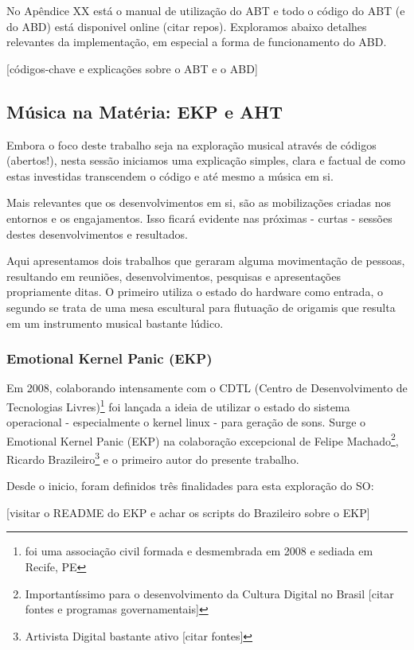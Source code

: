 No Apêndice XX está o manual de utilização do ABT e todo o código do ABT (e do ABD) está
disponivel online (citar repos). Exploramos abaixo detalhes relevantes da implementação,
em especial a forma de funcionamento do ABD.

[códigos-chave e explicações sobre o ABT e o ABD]




  \subsection{Música na Matéria: EKP e AHT}

Embora o foco deste trabalho seja na exploração musical através de códigos (abertos!),
nesta sessão iniciamos uma explicação simples, clara e factual de como estas
investidas transcendem o código e até mesmo a música em si.

Mais relevantes que os desenvolvimentos em si, são as mobilizações criadas nos
entornos e os engajamentos. Isso ficará evidente nas próximas - curtas - sessões
destes desenvolvimentos e resultados.

Aqui apresentamos dois trabalhos que geraram alguma movimentação de pessoas,
resultando em reuniões, desenvolvimentos, pesquisas e apresentações propriamente
ditas. O primeiro utiliza o estado do hardware como entrada, o segundo se trata
de uma mesa escultural para flutuação de origamis que resulta em um instrumento musical
bastante lúdico.


      \subsubsection{Emotional Kernel Panic (EKP)}

Em 2008, colaborando intensamente com o CDTL
(Centro de Desenvolvimento de Tecnologias Livres)\footnote{foi uma associação civil formada e desmembrada em 2008 e sediada em Recife, PE}
foi lançada a ideia de utilizar o estado do sistema operacional - especialmente o kernel linux - para
geração de sons. Surge o Emotional Kernel Panic (EKP) na colaboração excepcional de
Felipe Machado\footnote{Importantíssimo para o desenvolvimento da Cultura Digital no Brasil [citar fontes e programas governamentais]},
Ricardo Brazileiro\footnote{Artivista Digital bastante ativo [citar fontes]} e o primeiro autor do presente trabalho.

Desde o inicio, foram definidos três finalidades
para esta exploração do SO:

[visitar o README do EKP e achar os scripts do Brazileiro sobre o EKP]

